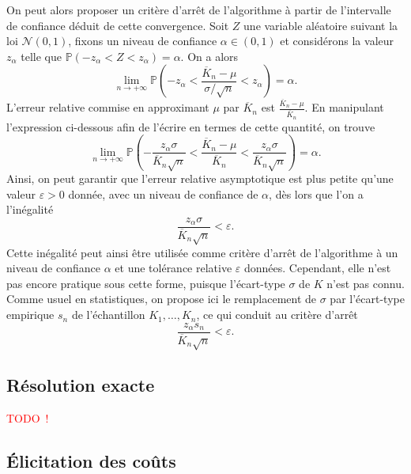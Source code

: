 \documentclass[a4paper,11pt]{article}
\theoremstyle{plain}
\theoremstyle{definition}
\begin{document}
On peut alors proposer un critère d'arrêt de l'algorithme à partir de l'intervalle de confiance déduit de cette convergence. Soit $Z$ une variable aléatoire suivant la loi $\mathcal N(0, 1)$, fixons un niveau de confiance $\alpha \in (0, 1)$ et considérons la valeur $z_\alpha$ telle que $\mathbb P(-z_\alpha < Z < z_\alpha) = \alpha$. On a alors
\[
\lim_{n \to +\infty} \mathbb P\left(-z_\alpha < \frac{\overline K_n - \mu}{\sigma / \sqrt{n}} < z_\alpha\right) = \alpha.
\]
L'erreur relative commise en approximant $\mu$ par $\overline K_n$ est $\frac{\overline K_n - \mu}{\overline K_n}$. En manipulant l'expression ci-dessous afin de l'écrire en termes de cette quantité, on trouve
\[
\lim_{n \to +\infty} \mathbb P\left(-\frac{z_\alpha \sigma}{\overline K_n \sqrt{n}} < \frac{\overline K_n - \mu}{\overline K_n} < \frac{z_\alpha \sigma}{\overline K_n \sqrt{n}}\right) = \alpha.
\]
Ainsi, on peut garantir que l'erreur relative asymptotique est plus petite qu'une valeur $\varepsilon > 0$ donnée, avec un niveau de confiance de $\alpha$, dès lors que l'on a l'inégalité
\[
\frac{z_\alpha \sigma}{\overline K_n \sqrt{n}} < \varepsilon.
\]
Cette inégalité peut ainsi être utilisée comme critère d'arrêt de l'algorithme à un niveau de con\-fiance $\alpha$ et une tolérance relative $\varepsilon$ données. Cependant, elle n'est pas encore pratique sous cette forme, puisque l'écart-type $\sigma$ de $K$ n'est pas connu. Comme usuel en statistiques, on propose ici le remplacement de $\sigma$ par l'écart-type empirique $s_n$ de l'échantillon $K_1, \dotsc, K_n$, ce qui conduit au critère d'arrêt
\begin{equation}
\label{EqCritereArret}
\frac{z_\alpha s_n}{\overline K_n \sqrt{n}} < \varepsilon.
\end{equation}

\subsection{Résolution exacte}
\label{SecExacte}

\textcolor{red}{TODO~!}

\subsection{Élicitation des coûts}
\label{SecContribElicitation}
\end{document}
